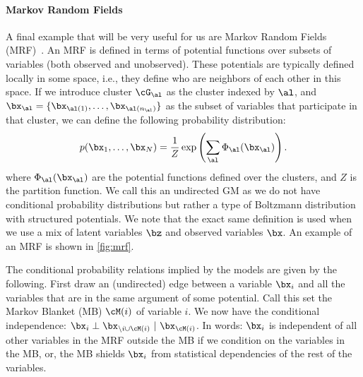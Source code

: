 \documentclass{lecture}
\begin{document}
\paragraph{Markov Random Fields}
A final example that will be very useful for us are Markov Random Fields (MRF)~\cite{Kindermann1980Markov}. An MRF is defined in terms of potential functions over subsets of variables (both observed and unobserved). These potentials are typically defined locally in some space, i.e., they define who are neighbors of each other in this space. If we introduce cluster $\cG_\al$ as the cluster indexed by $\al$, and $\bx_\al=\{\bx_{\al(1)},\ldots,\bx_{\al(n_\al)}\}$ as the subset of variables that participate in that cluster, we can define the following probability distribution:
\begin{align}
	p(\bx_1,\ldots,\bx_N)= \frac{1}{Z}\exp\left(\sum_\al \Phi_\al(\bx_\al)\right).
\end{align}
where $\Phi_\al(\bx_\al)$ are the potential functions defined over the clusters, and $Z$ is the partition function.
We call this an undirected GM as we do not have conditional probability distributions but rather a type of Boltzmann distribution with structured potentials. We note that the exact same definition is used when we use a mix of latent variables $\bz$ and observed variables $\bx$. An example of an MRF is shown in \cref{fig:mrf}.

The conditional probability relations implied by the models are given by the following. First draw an (undirected) edge between a variable $\bx_i$ and all the variables that are in the same argument of some potential. Call this set the Markov Blanket (MB) $\cM(i)$ of variable $i$. We now have the conditional independence: $\bx_i\perp \bx_{\backslash i\cup\cM(i)}~|~\bx_{\cM(i)}$. In words: $\bx_i$ is independent of all other variables in the MRF outside the MB if we condition on the variables in the MB, or, the MB shields $\bx_i$ from statistical dependencies of the rest of the variables.
\end{document}
